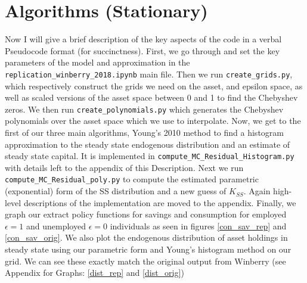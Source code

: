 \documentclass[11pt]{article}
\newcommand{\code}[1]{\texttt{#1}}
\begin{document}
\section{Algorithms (Stationary)}
Now I will give a brief description of the key aspects of the code in a verbal Pseudocode format (for succinctness). 
First, we go through and set the key parameters of the model and approximation in the \code{replication\_winberry\_2018.ipynb} main file.
Then we run \code{create\_grids.py}, which respectively construct the grids we need on the asset, and epsilon space, as well as scaled versions of the asset space between 0 and 1 to find the Chebyshev zeros. We then run \code{create\_polynomials.py} which generates the Chebyshev polynomials over the asset space which we use to interpolate. 
Now, we get to the first of our three main algorithms, Young's 2010 method to find a histogram approximation to the steady state endogenous distribution and an estimate of steady state capital. It is implemented in
 \code{compute\_MC\_Residual\_Histogram.py} with details left to the appendix of this Description.  Next we run \code{compute\_MC\_Residual\_poly.py} to compute the estimated parametric (exponential) form of the SS distribution and a new guess of $K_{SS}$. Again high-level descriptions of the implementation are moved to the appendix. 
Finally, we graph our extract policy functions for savings and consumption for employed $\epsilon =1$ and unemployed $\epsilon =0$ individuals as seen in figures \ref{con_sav_rep} and \ref{con_sav_orig}. We also plot the endogenous distribution of asset holdings in steady state using our parametric form  and Young's histogram method on our grid. We can see these exactly match the original output from Winberry (see Appendix for Graphs: \ref{dist_rep} and \ref{dist_orig})
\end{document}
